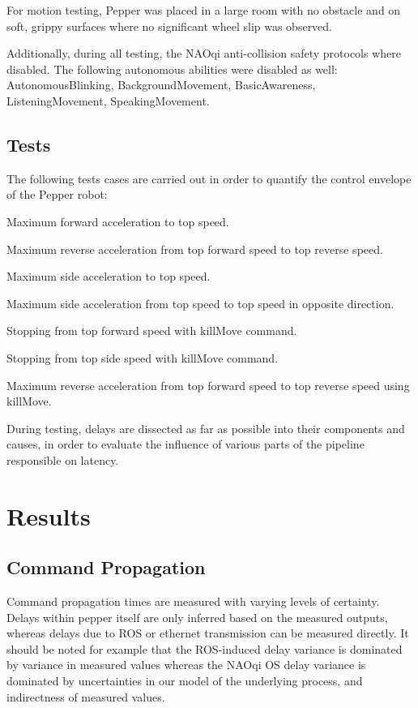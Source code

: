 \documentclass[11pt,a4paper]{article}
\newenvironment{packed_enum}{
  \setlength{\partopsep}{-8pt}
  \begin{enumerate}
  \setlength{\itemsep}{1pt}
  \setlength{\parskip}{0pt}
  \setlength{\parsep}{0pt}
}{\end{enumerate}}
\begin{document}
For motion testing, Pepper was placed in a large room with no obstacle and on soft, grippy surfaces where no significant wheel slip was observed.

Additionally, during all testing, the NAOqi anti-collision safety protocols where disabled. The following autonomous abilities were disabled as well: AutonomousBlinking, BackgroundMovement, BasicAwareness, ListeningMovement, SpeakingMovement. 

\subsection{Tests} \label{sec:tests}

The following tests cases are carried out in order to quantify the control envelope of the Pepper robot:

\begin{packed_enum}
\item Maximum forward acceleration to top speed.
\item Maximum reverse acceleration from top forward speed to top reverse speed.
\item Maximum side acceleration to top speed.
\item Maximum side acceleration from top speed to top speed in opposite direction.
\item Stopping from top forward speed with killMove command.
\item Stopping from top side speed with killMove command.
\item Maximum reverse acceleration from top forward speed to top reverse speed using killMove. 
\end{packed_enum}

During testing, delays are dissected as far as possible into their components and causes, in order to evaluate the influence of various parts of the pipeline responsible on latency.

\section{Results} \label{sec:results}

\subsection{Command Propagation}

Command propagation times are measured with varying levels of certainty. Delays within pepper itself are only inferred based on the measured outputs, whereas delays due to ROS or ethernet transmission can be measured directly. It should be noted for example that the ROS-induced delay variance is dominated by variance in measured values whereas the NAOqi OS delay variance is dominated by uncertainties in our model of the underlying process, and indirectness of measured values.
\end{document}
